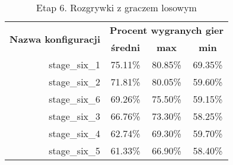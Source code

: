 \begin{longtable}[c]{|r|c|c|c|}
\caption{\label{tab:results/stage_six_all_with_random}Etap 6. Rozgrywki z graczem losowym} \\
\hline

\multirow{2}{*}{\textbf{Nazwa konfiguracji}} & \multicolumn{3}{|c|}{\textbf{Procent wygranych gier}} \\
\cline{2-4}
&\textbf{średni} & \textbf{max} & \textbf{min} \\
\hline
stage\_six\_1 & 75.11\% & 80.85\% & 69.35\% \\
\hline
stage\_six\_2 & 71.81\% & 80.05\% & 59.60\% \\
\hline
stage\_six\_6 & 69.26\% & 75.50\% & 59.15\% \\
\hline
stage\_six\_3 & 66.76\% & 73.30\% & 58.25\% \\
\hline
stage\_six\_4 & 62.74\% & 69.30\% & 59.70\% \\
\hline
stage\_six\_5 & 61.33\% & 66.90\% & 58.40\% \\
\hline
\end{longtable}
